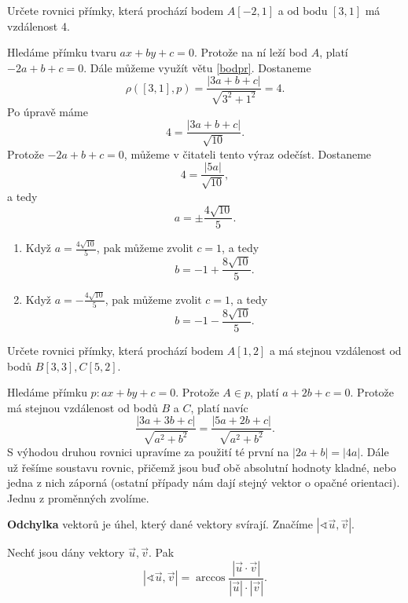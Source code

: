 \begin{priklad}
Určete rovnici přímky, která prochází bodem $A[-2,1]$ a od bodu $[3,1]$ má vzdálenost 4.
\end{priklad}

\begin{reseni}
Hledáme přímku tvaru $ax+by+c=0$. Protože na ní leží bod $A$, platí $-2a+b+c=0$. Dále
můžeme využít větu \ref{bodpr}. Dostaneme
$$
\rho([3,1],p) = \frac{|3a+b+c|}{\sqrt{3^2 + 1^2}} = 4.
$$
Po úpravě máme
$$
    4 = \frac{|3a+b+c|}{\sqrt{10}}.
$$
Protože $-2a+b+c=0$, můžeme v čitateli tento výraz odečíst. Dostaneme
$$
    4 = \frac{|5a|}{\sqrt{10}},
$$
a tedy
$$
    a = \pm \frac{4 \sqrt{10}}{5}.
$$
\begin{enumerate}[$i.$]
	\item Když $a = \frac{4 \sqrt{10}}{5}$, pak můžeme zvolit $c=1$, a tedy
	$$
	    b= -1 + \frac{8 \sqrt{10}}{5}.
	$$
	\item Když $a = -\frac{4 \sqrt{10}}{5}$, pak můžeme zvolit $c=1$, a tedy
	$$
	    b= -1 - \frac{8 \sqrt{10}}{5}.
	$$
\end{enumerate}
\end{reseni}

\begin{priklad}
Určete rovnici přímky, která prochází bodem $A[1,2]$ a má stejnou vzdálenost od bodů
$B[3,3], C[5,2].$
\end{priklad}

\begin{reseni}
    Hledáme přímku $p\colon ax+by+c=0$. Protože $A\in p$, platí $a+2b+c=0$. Protože má stejnou vzdálenost od bodů $B$ a $C$, platí navíc
    $$\frac{|3a+3b+c|}{\sqrt{a^2+b^2} }=\frac{|5a+2b+c|}{\sqrt{a^2+b^2} }.$$
    S výhodou druhou rovnici upravíme za použití té první na
    $|2a+b|=|4a|$. Dále už řešíme soustavu rovnic, přičemž jsou buď obě absolutní hodnoty kladné, nebo jedna z nich záporná (ostatní případy
    nám dají stejný vektor o opačné orientaci). Jednu z proměnných zvolíme.
\end{reseni}

\begin{definition}
    \textbf{Odchylka} vektorů je úhel, který dané vektory svírají. Značíme $|\sphericalangle \vec u, \vec v|.$
\end{definition}

\begin{veta}
    Nechť jsou dány vektory $\vec u, \vec v.$ Pak
    $$|\sphericalangle \vec u, \vec v|=\arccos \frac{|\vec u \cdot \vec v|}{|\vec u|\cdot |\vec v|}.$$
\end{veta}

